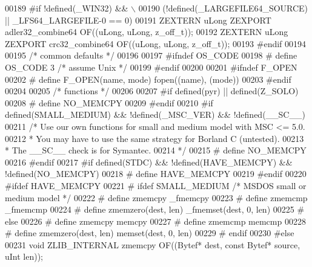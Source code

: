 \begin{DoxyCode}
00189 \textcolor{preprocessor}{#if !defined(\_WIN32) && \(\backslash\)}
00190 \textcolor{preprocessor}{    (!defined(\_LARGEFILE64\_SOURCE) || \_LFS64\_LARGEFILE-0 == 0)}
00191     ZEXTERN uLong ZEXPORT adler32\_combine64 OF((uLong, uLong, z\_off\_t));
00192     ZEXTERN uLong ZEXPORT crc32\_combine64 OF((uLong, uLong, z\_off\_t));
00193 \textcolor{preprocessor}{#endif}
00194 
00195         \textcolor{comment}{/* common defaults */}
00196 
00197 \textcolor{preprocessor}{#ifndef OS\_CODE}
00198 \textcolor{preprocessor}{#  define OS\_CODE  3     }\textcolor{comment}{/* assume Unix */}\textcolor{preprocessor}{}
00199 \textcolor{preprocessor}{#endif}
00200 
00201 \textcolor{preprocessor}{#ifndef F\_OPEN}
00202 \textcolor{preprocessor}{#  define F\_OPEN(name, mode) fopen((name), (mode))}
00203 \textcolor{preprocessor}{#endif}
00204 
00205          \textcolor{comment}{/* functions */}
00206 
00207 \textcolor{preprocessor}{#if defined(pyr) || defined(Z\_SOLO)}
00208 \textcolor{preprocessor}{#  define NO\_MEMCPY}
00209 \textcolor{preprocessor}{#endif}
00210 \textcolor{preprocessor}{#if defined(SMALL\_MEDIUM) && !defined(\_MSC\_VER) && !defined(\_\_SC\_\_)}
00211  \textcolor{comment}{/* Use our own functions for small and medium model with MSC <= 5.0.}
00212 \textcolor{comment}{  * You may have to use the same strategy for Borland C (untested).}
00213 \textcolor{comment}{  * The \_\_SC\_\_ check is for Symantec.}
00214 \textcolor{comment}{  */}
00215 \textcolor{preprocessor}{#  define NO\_MEMCPY}
00216 \textcolor{preprocessor}{#endif}
00217 \textcolor{preprocessor}{#if defined(STDC) && !defined(HAVE\_MEMCPY) && !defined(NO\_MEMCPY)}
00218 \textcolor{preprocessor}{#  define HAVE\_MEMCPY}
00219 \textcolor{preprocessor}{#endif}
00220 \textcolor{preprocessor}{#ifdef HAVE\_MEMCPY}
00221 \textcolor{preprocessor}{#  ifdef SMALL\_MEDIUM }\textcolor{comment}{/* MSDOS small or medium model */}\textcolor{preprocessor}{}
00222 \textcolor{preprocessor}{#    define zmemcpy \_fmemcpy}
00223 \textcolor{preprocessor}{#    define zmemcmp \_fmemcmp}
00224 \textcolor{preprocessor}{#    define zmemzero(dest, len) \_fmemset(dest, 0, len)}
00225 \textcolor{preprocessor}{#  else}
00226 \textcolor{preprocessor}{#    define zmemcpy memcpy}
00227 \textcolor{preprocessor}{#    define zmemcmp memcmp}
00228 \textcolor{preprocessor}{#    define zmemzero(dest, len) memset(dest, 0, len)}
00229 \textcolor{preprocessor}{#  endif}
00230 \textcolor{preprocessor}{#else}
00231    \textcolor{keywordtype}{void} ZLIB\_INTERNAL zmemcpy OF((Bytef* dest, \textcolor{keyword}{const} Bytef* source, uInt len));

\end{DoxyCode}
